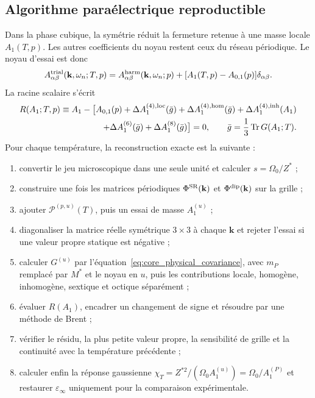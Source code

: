 \subsection{Algorithme paraélectrique reproductible}

Dans la phase cubique, la symétrie réduit la fermeture retenue à une masse
locale $A_1(T,p)$. Les autres coefficients du noyau restent ceux du réseau
périodique. Le noyau d'essai est donc
\begin{equation}
A^{\rm trial}_{\alpha\beta}(\mathbf k,\omega_n;T,p)
=A^{\rm harm}_{\alpha\beta}(\mathbf k,\omega_n;p)
+[A_1(T,p)-A_{0,1}(p)]\delta_{\alpha\beta}.
\label{eq:core_trial_full_lattice}
\end{equation}
La racine scalaire s'écrit
\begin{equation}
\begin{aligned}
R(A_1;T,p)\equiv A_1
-\big[
A_{0,1}(p)
+\Delta A_1^{(4),{\rm loc}}(\bar g)
+\Delta A_1^{(4),{\rm hom}}(\bar g)
+\Delta A_1^{(4),{\rm inh}}(A_1)\\
+\Delta A_1^{(6)}(\bar g)
+\Delta A_1^{(8)}(\bar g)
\big]=0,
\qquad
\bar g=\frac13\operatorname{Tr}G(A_1;T).
\end{aligned}
\label{eq:core_scalar_residual}
\end{equation}
Pour chaque température, la reconstruction exacte est la suivante :
\begin{enumerate}[label=\textbf{N\arabic*.},leftmargin=3.2em,itemsep=3pt]
  \item convertir le jeu microscopique dans une seule unité et calculer
  $s=\Omega_0/Z^*$ ;
  \item construire une fois les matrices périodiques
  $\Phi^{\rm SR}(\mathbf k)$ et $\Phi^{\rm dip}(\mathbf k)$ sur la grille ;
  \item ajouter $\mathcal P^{(p,u)}(T)$, puis un essai de masse $A_1^{(u)}$ ;
  \item diagonaliser la matrice réelle symétrique $3\times3$ à chaque
  $\mathbf k$ et rejeter l'essai si une valeur propre statique est négative ;
  \item calculer $G^{(u)}$ par l'équation~\eqref{eq:core_physical_covariance}, avec
  $m_P$ remplacé par $M^*$ et le noyau en $u$, puis les
  contributions locale, homogène, inhomogène, sextique et octique séparément ;
  \item évaluer $R(A_1)$, encadrer un changement de signe et résoudre par
  une méthode de Brent ;
  \item vérifier le résidu, la plus petite valeur propre, la sensibilité de
  grille et la continuité avec la température précédente ;
  \item calculer enfin la réponse gaussienne
  $\chi_T=Z^{*2}/(\Omega_0 A_1^{(u)})=\Omega_0/A_1^{(P)}$ et restaurer
  $\varepsilon_\infty$ uniquement pour la comparaison expérimentale.
\end{enumerate}

